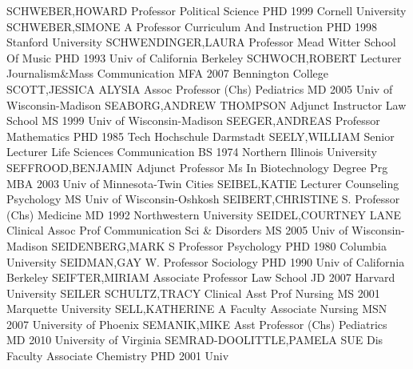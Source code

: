 \documentclass[
]{article}
\begin{document}
\textbar SCHWEBER,HOWARD \textbar Professor \textbar Political Science
\textbar PHD 1999 Cornell University \textbar{} 
\textbar SCHWEBER,SIMONE A \textbar Professor \textbar Curriculum And
Instruction \textbar PHD 1998 Stanford University \textbar{}
 \textbar SCHWENDINGER,LAURA \textbar Professor
\textbar Mead Witter School Of Music \textbar PHD 1993 Univ of
California Berkeley \textbar{}  \textbar SCHWOCH,ROBERT
\textbar Lecturer \textbar Journalism\&Mass Communication \textbar MFA
2007 Bennington College \textbar{}  \textbar SCOTT,JESSICA
ALYSIA \textbar Assoc Professor (Chs) \textbar Pediatrics \textbar MD
2005 Univ of Wisconsin-Madison \textbar{} 
\textbar SEABORG,ANDREW THOMPSON \textbar Adjunct Instructor
\textbar Law School \textbar MS 1999 Univ of Wisconsin-Madison
\textbar{}  \textbar SEEGER,ANDREAS \textbar Professor
\textbar Mathematics \textbar PHD 1985 Tech Hochschule Darmstadt
\textbar{}  \textbar SEELY,WILLIAM \textbar Senior Lecturer
\textbar Life Sciences Communication \textbar BS 1974 Northern Illinois
University \textbar{}  \textbar SEFFROOD,BENJAMIN
\textbar Adjunct Professor \textbar Ms In Biotechnology Degree Prg
\textbar MBA 2003 Univ of Minnesota-Twin Cities \textbar{} 
\textbar SEIBEL,KATIE \textbar Lecturer \textbar Counseling Psychology
\textbar MS Univ of Wisconsin-Oshkosh \textbar{} 
\textbar SEIBERT,CHRISTINE S. \textbar Professor (Chs) \textbar Medicine
\textbar MD 1992 Northwestern University \textbar{} 
\textbar SEIDEL,COURTNEY LANE \textbar Clinical Assoc Prof
\textbar Communication Sci \& Disorders \textbar MS 2005 Univ of
Wisconsin-Madison \textbar{}  \textbar SEIDENBERG,MARK S
\textbar Professor \textbar Psychology \textbar PHD 1980 Columbia
University \textbar{}  \textbar SEIDMAN,GAY W.
\textbar Professor \textbar Sociology \textbar PHD 1990 Univ of
California Berkeley \textbar{}  \textbar SEIFTER,MIRIAM
\textbar Associate Professor \textbar Law School \textbar JD 2007
Harvard University \textbar{}  \textbar SEILER SCHULTZ,TRACY
\textbar Clinical Asst Prof \textbar Nursing \textbar MS 2001 Marquette
University \textbar{}  \textbar SELL,KATHERINE A
\textbar Faculty Associate \textbar Nursing \textbar MSN 2007 University
of Phoenix \textbar{}  \textbar SEMANIK,MIKE \textbar Asst
Professor (Chs) \textbar Pediatrics \textbar MD 2010 University of
Virginia \textbar{}  \textbar SEMRAD-DOOLITTLE,PAMELA SUE
\textbar Dis Faculty Associate \textbar Chemistry \textbar PHD 2001 Univ
\end{document}
